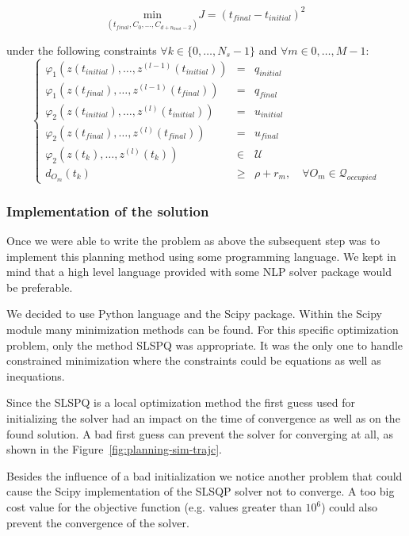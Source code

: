 \begin{equation}\label{eq:objective}
	\underset{(t_{final},C_0,\dotsc,C_{d+n_{knot}-2})}{\mathrm{min}} J = (t_{final}-t_{initial})^{2}
\end{equation}

under the following constraints $\forall k \in \{0,\dotsc,N_s -1\}$ and $\forall m \in {0,\dotsc,M-1}$:
\begin{equation}%
\left\lbrace\begin{array}{lcl}
    \varphi_1(z(t_{initial}),\dotsc,z^{(l-1)}(t_{initial})) & = & q_{initial}\\
    \varphi_1(z(t_{final}),\dotsc,z^{(l-1)}(t_{final})) & = & q_{final}\\
    \varphi_2(z(t_{initial}),\dotsc,z^{(l)}(t_{initial})) & = & u_{initial}\\
    \varphi_2(z(t_{final}),\dotsc,z^{(l)}(t_{final}))& = & u_{final}\\
    \varphi_2(z(t_k),\dotsc,z^{(l)}(t_k)) &\in& \mathcal{U}\\
    d_{O_m}(t_k) &\geq& \rho + r_m,\quad \forall O_m \in \mathcal{Q}_{occupied}
\end{array}\right.
\end{equation}

\subsubsection{Implementation of the solution}

Once we were able to write the problem as above the subsequent step was to implement this planning method using some programming language. We kept in mind that a high level language provided with some NLP solver package would be preferable.

We decided to use Python language and the Scipy package. Within the Scipy module many minimization methods can be found. For this specific optimization problem, only the method SLSPQ was appropriate. It was the only one to handle constrained minimization where the constraints could be equations as well as inequations.

Since the SLSPQ is a local optimization method the first guess used for initializing the solver had an impact on the time of convergence as well as on the found solution. A bad first guess can prevent the solver for converging at all, as shown in the Figure~\ref{fig:planning-sim-trajc}.

Besides the influence of a bad initialization we notice another problem that could cause the Scipy implementation of the SLSQP solver not to converge. A too big cost value for the objective function (e.g. values greater than $10^6$) could also prevent the convergence of the solver.

